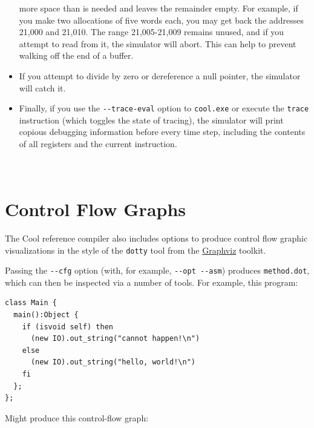 \documentclass[]{article}
\begin{document}
\begin{itemize}
  more space than is needed and leaves the remainder empty. For example,
  if you make two allocations of five words each, you may get back the
  addresses 21,000 and 21,010. The range 21,005-21,009 remains unused,
  and if you attempt to read from it, the simulator will abort. This can
  help to prevent walking off the end of a buffer.
\item
  If you attempt to divide by zero or dereference a null pointer, the
  simulator will catch it.
\item
  Finally, if you use the \texttt{-{}-trace-eval} option to
  \texttt{cool.exe} or execute the \texttt{trace} instruction (which
  toggles the state of tracing), the simulator will print copious
  debugging information before every time step, including the contents
  of all registers and the current instruction.
\end{itemize}

\section{\\ Control Flow Graphs}

The Cool reference compiler also includes options to produce control
flow graphic visualizations in the style of the \texttt{dotty} tool from
the \href{http://en.wikipedia.org/wiki/Graphviz}{Graphviz} toolkit.

Passing the \texttt{-{}-cfg} option (with, for example,
\texttt{-{}-opt -{}-asm}) produces \texttt{method.dot}, which can then
be inspected via a number of tools. For example, this program:

\begin{verbatim}
class Main {
  main():Object {
    if (isvoid self) then  
      (new IO).out_string("cannot happen!\n")
    else 
      (new IO).out_string("hello, world!\n")
    fi 
  };
};
\end{verbatim}

Might produce this control-flow graph:
\end{document}
